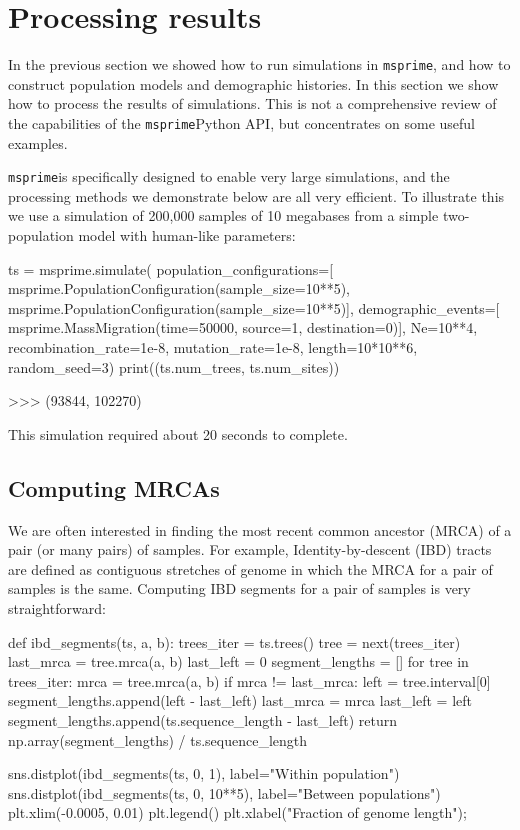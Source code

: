 \documentclass[graybox]{svmult}
\newcommand{\msprime}[0]{\texttt{msprime}}
\begin{document}

\section{Processing results}\label{processing-results}

In the previous section we showed how to run simulations in \msprime, and
how to construct population models and demographic histories. In this
section we show how to process the results of simulations. This is not a
comprehensive review of the capabilities of the \msprime Python API, but
concentrates on some useful examples.

\msprime is specifically designed to enable very large simulations, and
the processing methods we demonstrate below are all very efficient. To
illustrate this we use a simulation of 200,000 samples of 10 megabases
from a simple two-population model with human-like parameters:

\begin{pythoncode}
ts = msprime.simulate(
    population_configurations=[
        msprime.PopulationConfiguration(sample_size=10**5),
        msprime.PopulationConfiguration(sample_size=10**5)],
    demographic_events=[
        msprime.MassMigration(time=50000, source=1, destination=0)],
    Ne=10**4, recombination_rate=1e-8, mutation_rate=1e-8, length=10*10**6,
    random_seed=3)
print((ts.num_trees, ts.num_sites))

>>> (93844, 102270)
\end{pythoncode}

This simulation required about 20 seconds to complete.


\subsection{Computing MRCAs}\label{computing-mrcas}

We are often interested in finding the most recent common ancestor (MRCA)
of a pair (or many pairs) of samples. For example, Identity-by-descent
(IBD) tracts are defined as contiguous stretches of genome in which the
MRCA for a pair of samples is the same. Computing IBD segments for a
pair of samples is very straightforward:

\begin{pythoncode}
def ibd_segments(ts, a, b):
    trees_iter = ts.trees()
    tree = next(trees_iter)
    last_mrca = tree.mrca(a, b)
    last_left = 0
    segment_lengths = []
    for tree in trees_iter:
        mrca = tree.mrca(a, b)
        if mrca != last_mrca:
            left = tree.interval[0]
            segment_lengths.append(left - last_left)
            last_mrca = mrca
            last_left = left
    segment_lengths.append(ts.sequence_length - last_left)
    return np.array(segment_lengths) / ts.sequence_length

sns.distplot(ibd_segments(ts, 0, 1), label="Within population")
sns.distplot(ibd_segments(ts, 0, 10**5), label="Between populations")
plt.xlim(-0.0005, 0.01)
plt.legend()
plt.xlabel("Fraction of genome length");
\end{pythoncode}
\end{document}
